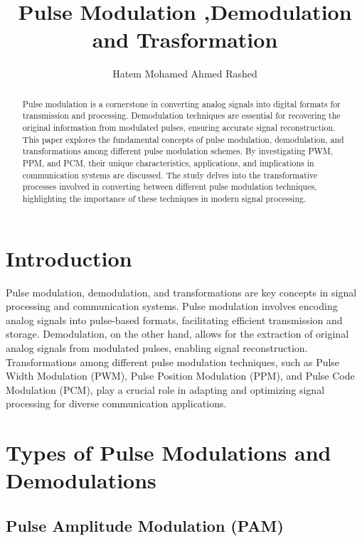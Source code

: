 \documentclass{IEEEtran}
\begin{document}
	\newcommand{\authorID}[2]{#1{\space #2}}
	\title{Pulse Modulation ,Demodulation and Trasformation}
	
	\author{\authorID{Hatem Mohamed Ahmed Rashed}{20010447}}
	
	\maketitle
	
	\begin{abstract}
		Pulse modulation is a cornerstone in converting analog signals into digital formats for transmission and processing. Demodulation techniques are essential for recovering the original information from modulated pulses, ensuring accurate signal reconstruction. 
		This paper explores the fundamental concepts of pulse modulation, demodulation, and transformations among different pulse modulation schemes. By investigating PWM, PPM, and PCM, their unique characteristics, applications, and implications in communication systems are discussed. The study delves into the transformative processes involved in converting between different pulse modulation techniques, highlighting the importance of these techniques in modern signal processing.
	\end{abstract}
	
	\section{Introduction}
		Pulse modulation, demodulation, and transformations are key concepts in signal processing and communication systems. Pulse modulation involves encoding analog signals into pulse-based formats, facilitating efficient transmission and storage. Demodulation, on the other hand, allows for the extraction of original analog signals from modulated pulses, enabling signal reconstruction. Transformations among different pulse modulation techniques, such as Pulse Width Modulation (PWM), Pulse Position Modulation (PPM), and Pulse Code Modulation (PCM), play a crucial role in adapting and optimizing signal processing for diverse communication applications.
	\section{Types of Pulse Modulations and Demodulations}
	
	
	\subsection{Pulse Amplitude Modulation (PAM)}
	
\end{document}
